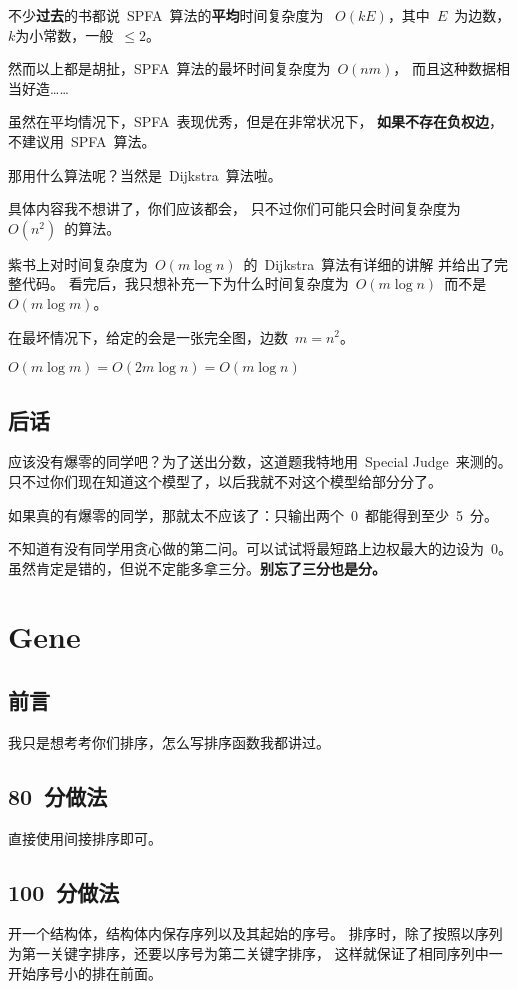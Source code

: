 \documentclass[12pt, hyperref, UTF8]{article}
\begin{document}
	不少\textbf{过去}的书都说~SPFA~算法的\textbf{平均}时间复杂度为
	~$O(kE)$，其中~$E$~为边数，$k$为小常数，一般~$\le 2$。

	\Large
	然而以上都是胡扯，SPFA~算法的最坏时间复杂度为~$O(nm)$，
	而且这种数据相当好造……

	\normalsize
	虽然在平均情况下，SPFA~表现优秀，但是在非常状况下，
	\textbf{如果不存在负权边}，不建议用~SPFA~算法。
	
	\bigskip
	那用什么算法呢？当然是~Dijkstra~算法啦。

	具体内容我不想讲了，你们应该都会，
	只不过你们可能只会时间复杂度为~$O(n^2)$~的算法。

	紫书上对时间复杂度为~$O(m \log n)$~的~Dijkstra~算法有详细的讲解
	并给出了完整代码。
	看完后，我只想补充一下为什么时间复杂度为~$O(m \log n)$~而不是
	~$O(m \log m)$。

	\bigskip
	在最坏情况下，给定的会是一张完全图，边数~$m = n^2$。

	\begin{center}
		$O(m \log m) = O(2 m \log n) = O(m \log n)$
	\end{center}

	\subsection{后话}
	应该没有爆零的同学吧？为了送出分数，这道题我特地用~Special Judge~来测的。
	只不过你们现在知道这个模型了，以后我就不对这个模型给部分分了。

	如果真的有爆零的同学，那就太不应该了：只输出两个~0~都能得到至少~5~分。

	\bigskip
	不知道有没有同学用贪心做的第二问。可以试试将最短路上边权最大的边设为~0。
	虽然肯定是错的，但说不定能多拿三分。\textbf{别忘了三分也是分。}

	\section{Gene}

	\subsection{前言}
	我只是想考考你们排序，怎么写排序函数我都讲过。

	\subsection{80~分做法}
	直接使用间接排序即可。

	\subsection{100~分做法}
	开一个结构体，结构体内保存序列以及其起始的序号。
	排序时，除了按照以序列为第一关键字排序，还要以序号为第二关键字排序，
	这样就保证了相同序列中一开始序号小的排在前面。
\end{document}
